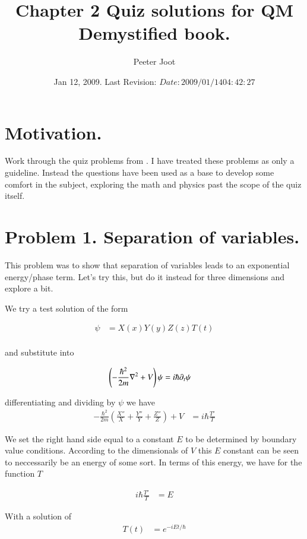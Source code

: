 \documentclass{article}
\title{ Chapter 2 Quiz solutions for QM Demystified book. }
\author{Peeter Joot}
\date{ Jan 12, 2009.  Last Revision: $Date: 2009/01/14 04:42:27 $ }
\begin{document}
\maketitle{}
\tableofcontents
\section{ Motivation. }

Work through the quiz problems from \cite{mcmahon2005qmd}.  I have treated these problems as only a guideline.  Instead the questions have been used as a
base to develop some comfort in the subject, exploring the math and physics past the scope of the quiz itself.

\section{ Problem 1. Separation of variables. }

This problem was to show that separation of variables leads to an exponential energy/phase
term.  Let's try this, but do it instead for three dimensions and explore a bit.

We try a test solution of the form

\begin{align*}
\psi &= X(x) Y(y) Z(z) T(t) \\
\end{align*}

and substitute into 

\begin{align*}
\left(-\frac{\hbar^2}{2m}\nabla^2 + V\right) \psi &= i \hbar \partial_t \psi
\end{align*}

differentiating and dividing by $\psi$ we have
\begin{align*}
-\frac{\hbar^2}{2m}
\left(
\frac{X''}{X}
+\frac{Y''}{Y}
+\frac{Z''}{Z}
\right)
 + V &= i \hbar \frac{T'}{T}
\end{align*}

We set the right hand side equal to a constant $E$ to be determined by boundary value conditions.
According to the dimensionals of $V$ this $E$ constant can be seen to neccessarily be an energy
of some sort.  In terms of this energy, we have for the function $T$

\begin{align*}
i \hbar \frac{T'}{T} &= E
\end{align*}

With a solution of
\begin{align*}
T(t) &= e^{-i E t/\hbar}
\end{align*}
\end{document}
